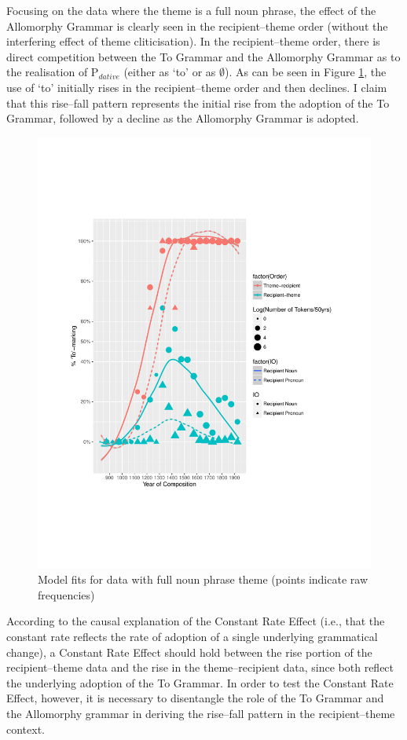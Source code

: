 	Focusing on the data where the theme is a full noun phrase, the effect of the Allomorphy Grammar is clearly seen in the recipient--theme order (without the interfering effect of theme cliticisation). In the recipient--theme order, there is direct competition between the To Grammar and the Allomorphy Grammar as to the realisation of P$_{dative}$ (either as `to' or as $\emptyset$). As can be seen in Figure \ref{fig:brit-tn}, the use of `to' initially rises in the recipient--theme order and then declines. I claim that this rise--fall pattern represents the initial rise from the adoption of the To Grammar, followed by a decline as the Allomorphy Grammar is adopted.

	\begin{figure}
		\includegraphics[width=\linewidth]{../images/brit-tn}
		\caption{Model fits for data with full noun phrase theme (points indicate raw frequencies)}
		\label{fig:brit-tn}
	\end{figure}
	
	According to the causal explanation of the Constant Rate Effect (i.e., that the constant rate reflects the rate of adoption of a single underlying grammatical change), a Constant Rate Effect should hold between the rise portion of the recipient--theme data and the rise in the theme--recipient data, since both reflect the underlying adoption of the To Grammar. In order to test the Constant Rate Effect, however, it is necessary to disentangle the role of the To Grammar and the Allomorphy grammar in deriving the rise--fall pattern in the recipient--theme context. 

